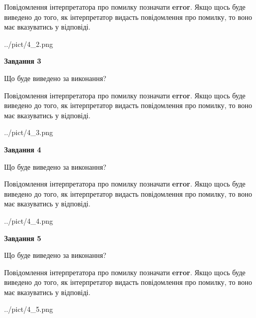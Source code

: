 \documentclass[12pt, ukrainian]{article}
\begin{document}
{\begin {large}
Повідомлення інтерпретатора про помилку позначати \textbf{error}.
Якщо щось буде виведено до того, як інтерпретатор видасть повідомлення про помилку, 
то воно має вказуватись у відповіді. \par


\begin{center}
	{../pict/4_2.png}
\end{center}
\newpage

{\begin {center}\textbf{Завдання 3}\end {center}}\par
Що буде виведено за виконання?

Повідомлення інтерпретатора про помилку позначати \textbf{error}.
Якщо щось буде виведено до того, як інтерпретатор видасть повідомлення про помилку, 
то воно має вказуватись у відповіді. \par


\begin{center}
	{../pict/4_3.png}
\end{center}
\newpage

{\begin {center}\textbf{Завдання 4}\end {center}}\par
Що буде виведено за виконання?

Повідомлення інтерпретатора про помилку позначати \textbf{error}.
Якщо щось буде виведено до того, як інтерпретатор видасть повідомлення про помилку, 
то воно має вказуватись у відповіді. \par


\begin{center}
	{../pict/4_4.png}
\end{center}
\newpage

{\begin {center}\textbf{Завдання 5}\end {center}}\par
Що буде виведено за виконання?

Повідомлення інтерпретатора про помилку позначати \textbf{error}.
Якщо щось буде виведено до того, як інтерпретатор видасть повідомлення про помилку, 
то воно має вказуватись у відповіді. \par


\begin{center}
	{../pict/4_5.png}
\end{center}
\newpage


\end{large}}
\end{document}
